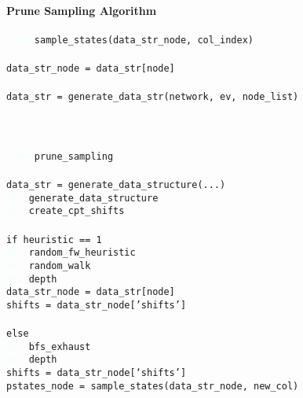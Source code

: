 \documentclass{amsart}
\newcommand\tab[1][1cm]{\hspace*{#1}}
\newcommand{\blue}[1]{\textcolor{azure}{#1}}
\newcommand{\blond}[1]{\textcolor{blond}{#1}}
\theoremstyle{plain}
\theoremstyle{remark}
\theoremstyle{plain}
\begin{document}
\vspace{2pc}
\makebox[\linewidth]{\rule{\textwidth}{0.6pt}} \\
\textbf{Prune Sampling Algorithm} \\
\makebox[\linewidth]{\rule{\textwidth}{0.4pt}} \\
\texttt{
\blue{def} sample\_states(data\_str\_node, col\_index) \\ \\
data\_str\_node = data\_str[node] \\ \\
data\_str = generate\_data\_str(network, ev, node\_list) \\ \\
} \\
\makebox[\linewidth]{\rule{\textwidth}{0.4pt}} \\

\texttt{
\blue{def} \blond{prune\_sampling} \\ \\
\tab data\_str = generate\_data\_structure(...) \\
\tab \blue{def} \blond{generate\_data\_structure} \\
\tab \tab \blue{def} \blond{create\_cpt\_shifts} \\ \\
\tab if heuristic == 1 \\
\tab \blue{def} \blond{random\_fw\_heuristic} \\
\tab \tab \blue{def} \blond{random\_walk} \\
\tab \tab \tab \blue{def} \blond{depth} \\
\tab \tab \tab \tab data\_str\_node = data\_str[node] \\
\tab \tab \tab \tab shifts = data\_str\_node['shifts'] \\ \\
\tab else \\
\tab \blue{def} \blond{bfs\_exhaust} \\
\tab \tab \blue{def} \blond{depth} \\ 
\tab \tab \tab shifts = data\_str\_node[`shifts'] \\
\tab \tab \tab pstates\_node = sample\_states(data\_str\_node, new\_col)
} \vspace{2pc}
\end{document}
